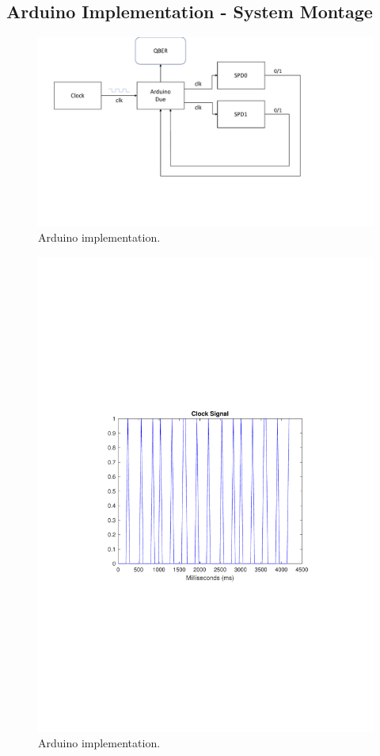\begin{refsection}
\subsection{Arduino Implementation - System Montage}
\begin{figure}[H]
	\centering
	\includegraphics[width=1\linewidth]{./sdf/arduino_quantum_rx/figures/montageDiagram.pdf}
	\caption{Arduino implementation.}
	\label{montage}
\end{figure}

\begin{figure}[H]
	\centering
	\includegraphics[width=1\linewidth]{./sdf/arduino_quantum_rx/figures/clockSignal.pdf}
	\caption{Arduino implementation.}
	\label{montage}
\end{figure}



\end{refsection}
